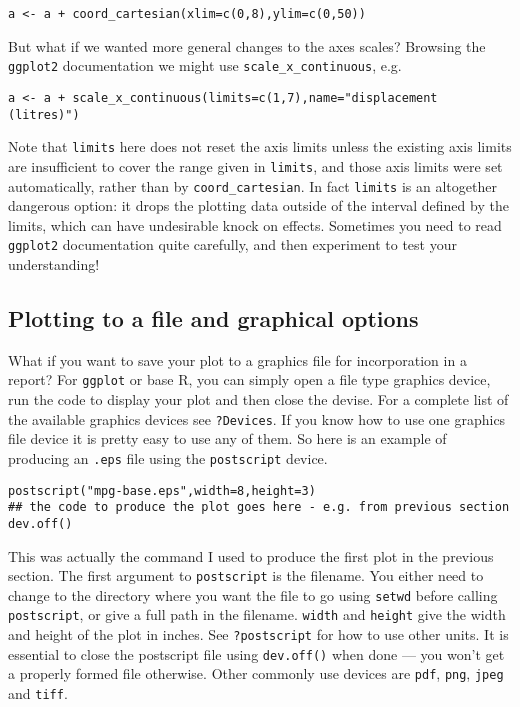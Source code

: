 \documentclass[10pt] {article}
\theoremstyle{definition}
\begin{document}
\begin{lstlisting}
a <- a + coord_cartesian(xlim=c(0,8),ylim=c(0,50))
\end{lstlisting} 
But what if we wanted more general changes to the axes scales? Browsing the {\tt ggplot2} documentation we might use \lstinline+scale_x_continuous+, e.g.
\begin{lstlisting}
a <- a + scale_x_continuous(limits=c(1,7),name="displacement (litres)")
\end{lstlisting} 
Note that {\tt limits} here does not reset the axis limits unless the existing axis limits are insufficient to cover the range given in {\tt limits}, and those axis limits were set automatically, rather than by \lstinline+coord_cartesian+. In fact {\tt limits} is an altogether dangerous option: it drops the plotting data outside of the interval defined by the limits, which can have undesirable knock on effects. Sometimes you need to read {\tt ggplot2} documentation quite carefully, and then experiment to test your understanding! 

\subsection{Plotting to a file and graphical options}

What if you want to save your plot to a graphics file for incorporation in a report? For {\tt ggplot} or base R, you can simply open a file type graphics device, run the code to display your plot and then close the devise. For a complete list of the available graphics devices see {\tt ?Devices}. If you know how to use one graphics file device it is pretty easy to use any of them. So here is an example of producing an {\tt .eps} file using the {\tt postscript} device. 
\begin{lstlisting}
postscript("mpg-base.eps",width=8,height=3)
## the code to produce the plot goes here - e.g. from previous section
dev.off()
\end{lstlisting}
This was actually the command I used to produce the first plot in the previous section. The first argument to {\tt postscript} is the filename. You either need to change to the directory where you want the file to go using \lstinline+setwd+ before calling \lstinline+postscript+, or give a full path in the filename. {\tt width} and {\tt height} give the width and height of the plot in inches. See {\tt ?postscript} for how to use other units. It is essential to close the postscript file using \lstinline+dev.off()+ when done --- you won't get a properly formed file otherwise. Other commonly use devices are {\tt pdf}, {\tt png}, {\tt jpeg} and {\tt tiff}.  
\end{document}
